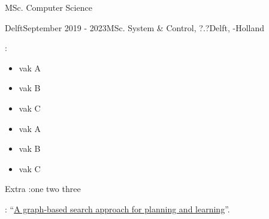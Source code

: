 \begin{rSection}{}
  \begin{experienceItem}
    {}{}{ MSc. Computer Science }{}
  \end{experienceItem}

  \begin{experienceItem}
    { Delft}{September 2019 -  2023}{MSc. System \& Control,  ?.?}{Delft, -Holland}
  \end{experienceItem}
  \begin{experienceItem}
    {}{}{:}{}
  \end{experienceItem}

  \vspace{-0.1cm}
  \begin{minipage}{0.4\textwidth}
  \begin{itemize}
    \item vak A\\[-3ex]
    \item vak B\\[-3ex]
    \item vak C\\[-3ex]
  \end{itemize}
  \end{minipage}
  \begin{minipage}{0.4\textwidth}
  \begin{itemize}
    \item vak A\\[-3ex]
    \item vak B\\[-3ex]
    \item vak C\\[-3ex]
  \end{itemize}
  \end{minipage}

  \begin{experienceItem}
    {\hphantom{}}{}{Extra :}{one two three}{}
  \end{experienceItem}


  \begin{experienceItem}
    {}{}{: ``\href{https://repository.tudelft.nl/islandora/object/uuid\%3Af988aaf6-c2a7-4782-b5de-8ca6187d03ef?collection=education}{A graph-based search approach for planning and learning}''.} {}
  \end{experienceItem}
\end{rSection}

